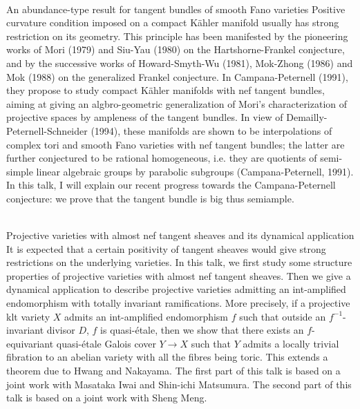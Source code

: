 \documentclass[dvipdfmx,a4paper,12pt]{article}
\theoremstyle{plain} %
\theoremstyle{definition} %
\begin{document}
\\
An abundance-type result for tangent bundles of smooth Fano varieties
\vskip3mm
Positive curvature condition imposed on a compact Kähler manifold usually has strong restriction on its geometry. This principle has been manifested by the pioneering works of Mori (1979) and Siu-Yau (1980) on the Hartshorne-Frankel conjecture, and by the successive works of Howard-Smyth-Wu (1981), Mok-Zhong (1986) and Mok (1988) on the generalized Frankel conjecture. In Campana-Peternell (1991), they propose to study compact Kähler manifolds with nef tangent bundles, aiming at giving an algbro-geometric generalization of Mori's characterization of projective spaces by ampleness of the tangent bundles. In view of Demailly-Peternell-Schneider (1994), these manifolds are shown to be interpolations of complex tori and smooth Fano varieties with nef tangent bundles; the latter are further conjectured to be rational homogeneous, i.e. they are quotients of semi-simple linear algebraic groups by parabolic subgroups (Campana-Peternell, 1991). In this talk, I will explain our recent progress towards the Campana-Peternell conjecture: we prove that the tangent bundle is big thus semiample.
\vskip6mm

\newpage 

\\
Projective varieties with almost nef tangent sheaves and its dynamical application 
\vskip3mm
It is expected that a certain positivity of tangent sheaves would give strong restrictions on the underlying varieties. In this talk, we first study some structure properties of projective varieties with almost nef tangent sheaves. Then we give a dynamical application to describe projective varieties admitting an int-amplified endomorphism with totally invariant ramifications. More precisely, if a projective klt variety $X$ admits an int-amplified endomorphism $f$ such that outside an $f^{-1}$-invariant divisor $D$, $f$ is quasi-\'etale, then we show that there exists an $f$-equivariant quasi-\'etale Galois cover $Y\to X$ such that $Y$ admits a locally trivial fibration to an abelian variety with all the fibres being toric. This extends a theorem due to Hwang and Nakayama. The first part of this talk is based on a joint work with Masataka Iwai and Shin-ichi Matsumura. The second part of this talk is based on a joint work with Sheng Meng.
\end{document}
